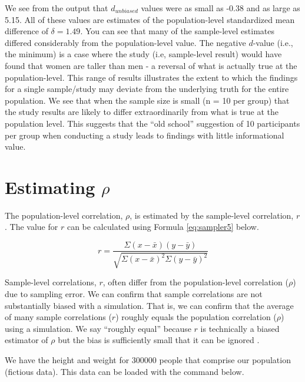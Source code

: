\documentclass[
]{krantz}
\begin{document}
We see from the output that \(d_{unbiased}\) values were as small as -0.38 and as large as 5.15. All of these values are estimates of the population-level standardized mean difference of \(\delta = 1.49\). You can see that many of the sample-level estimates differed considerably from the population-level value. The negative \(d\)-value (i.e., the minimum) is a case where the study (i.e, sample-level result) would have found that women are taller than men - a reversal of what is actually true at the population-level. This range of results illustrates the extent to which the findings for a single sample/study may deviate from the underlying truth for the entire population. We see that when the sample size is small (n = 10 per group) that the study results are likely to differ extraordinarily from what is true at the population level. This suggests that the ``old school'' suggestion of 10 participants per group when conducting a study leads to findings with little informational value.

\hypertarget{estimating-rho}{%
\section{\texorpdfstring{Estimating \(\rho\)}{Estimating \textbackslash rho}}\label{estimating-rho}}

The population-level correlation, \(\rho\), is estimated by the sample-level correlation, \(r\). The value for \(r\) can be calculated using Formula \eqref{eq:sampler5} below.

\begin{equation} 
r =  \frac{\Sigma (x - \bar{x})(y - \bar{y})}{\sqrt{\Sigma (x - \bar{x})^2\Sigma (y - \bar{y})^2}}
      \label{eq:sampler5}
\end{equation}

Sample-level correlations, \(r\), often differ from the population-level correlation (\(\rho\)) due to sampling error. We can confirm that sample correlations are not substantially biased with a simulation. That is, we can confirm that the average of many sample correlations (\(r\)) roughly equals the population correlation (\(\rho\)) using a simulation. We say ``roughly equal'' because \(r\) is technically a biased estimator of \(\rho\) but the bias is sufficiently small that it can be ignored \citep{schmidt2014methods}.

We have the height and weight for 300000 people that comprise our population (fictious data). This data can be loaded with the command below.
\end{document}
